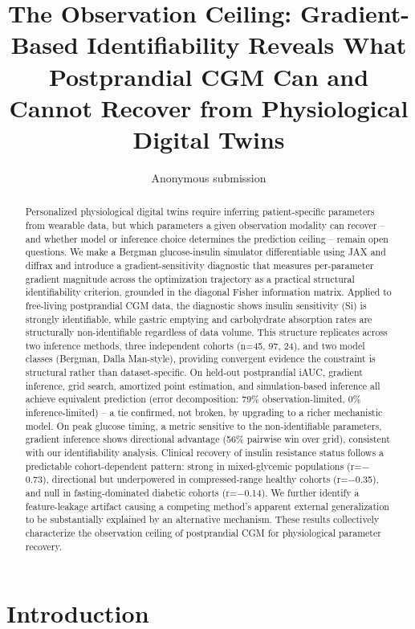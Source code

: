 \documentclass[letterpaper]{article} %
\title{The Observation Ceiling: Gradient-Based Identifiability Reveals What Postprandial CGM Can and Cannot Recover from Physiological Digital Twins}
\author{
    Anonymous submission
}
\begin{document}
\maketitle

\begin{abstract}
Personalized physiological digital twins require inferring patient-specific parameters from
wearable data, but which parameters a given observation modality can recover -- and whether model
or inference choice determines the prediction ceiling -- remain open questions. We make a Bergman
glucose-insulin simulator differentiable using JAX and diffrax and introduce a gradient-sensitivity
diagnostic that measures per-parameter gradient magnitude across the optimization trajectory as a
practical structural identifiability criterion, grounded in the diagonal Fisher information matrix.
Applied to free-living postprandial CGM data, the diagnostic shows insulin sensitivity (Si) is
strongly identifiable, while gastric emptying and carbohydrate absorption rates are structurally
non-identifiable regardless of data volume. This structure replicates across two inference methods,
three independent cohorts (n=45, 97, 24), and two model classes (Bergman, Dalla Man-style),
providing convergent evidence the constraint is structural rather than dataset-specific. On
held-out postprandial iAUC, gradient inference, grid search, amortized point estimation, and
simulation-based inference all achieve equivalent prediction (error decomposition: 79\%
observation-limited, 0\% inference-limited) -- a tie confirmed, not broken, by upgrading to a
richer mechanistic model. On peak glucose timing, a metric sensitive to the non-identifiable
parameters, gradient inference shows directional advantage (56\% pairwise win over grid),
consistent with our identifiability analysis. Clinical recovery of insulin resistance status
follows a predictable cohort-dependent pattern: strong in mixed-glycemic populations (r=$-$0.73),
directional but underpowered in compressed-range healthy cohorts (r=$-$0.35), and null in
fasting-dominated diabetic cohorts (r=$-$0.14). We further identify a feature-leakage artifact
causing a competing method's apparent external generalization to be substantially explained by an
alternative mechanism. These results collectively characterize the observation ceiling of
postprandial CGM for physiological parameter recovery.
\end{abstract}

\section{Introduction}
\end{document}
